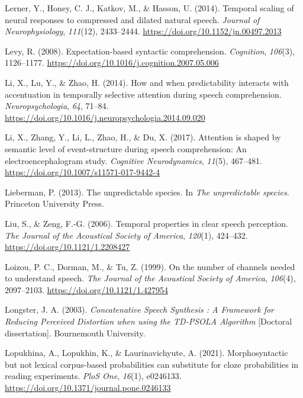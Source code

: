 \documentclass[a4paper, nobind]{templates/ociamthesis}
\newlength{\cslhangindent}
\newenvironment{CSLReferences}[2] %
 {%
  \setlength{\parindent}{0pt}
  \ifodd #1
  \let\oldpar\par
  \def\par{\hangindent=\cslhangindent\oldpar}
  \fi
  \setlength{\parskip}{1mm}
  \setlength{\baselineskip}{6mm}
 }%
 {}
\begin{document}
\begin{CSLReferences}{1}{0}
\leavevmode{}%
Lerner, Y., Honey, C. J., Katkov, M., \& Hasson, U. (2014). {Temporal scaling of neural responses to compressed and dilated natural speech}. \emph{Journal of Neurophysiology}, \emph{111}(12), 2433--2444. \url{https://doi.org/10.1152/jn.00497.2013}

\leavevmode{}%
Levy, R. (2008). Expectation-based syntactic comprehension. \emph{Cognition}, \emph{106}(3), 1126--1177. \url{https://doi.org/10.1016/j.cognition.2007.05.006}

\leavevmode{}%
Li, X., Lu, Y., \& Zhao, H. (2014). {How and when predictability interacts with accentuation in temporally selective attention during speech comprehension}. \emph{Neuropsychologia}, \emph{64}, 71--84. \url{https://doi.org/10.1016/j.neuropsychologia.2014.09.020}

\leavevmode{}%
Li, X., Zhang, Y., Li, L., Zhao, H., \& Du, X. (2017). {Attention is shaped by semantic level of event-structure during speech comprehension: An electroencephalogram study}. \emph{Cognitive Neurodynamics}, \emph{11}(5), 467--481. \url{https://doi.org/10.1007/s11571-017-9442-4}

\leavevmode{}%
Lieberman, P. (2013). The unpredictable species. In \emph{The unpredictable species}. Princeton University Press.

\leavevmode{}%
Liu, S., \& Zeng, F.-G. (2006). {Temporal properties in clear speech perception}. \emph{The Journal of the Acoustical Society of America}, \emph{120}(1), 424--432. \url{https://doi.org/10.1121/1.2208427}

\leavevmode{}%
Loizou, P. C., Dorman, M., \& Tu, Z. (1999). On the number of channels needed to understand speech. \emph{The Journal of the Acoustical Society of America}, \emph{106}(4), 2097--2103. \url{https://doi.org/10.1121/1.427954}

\leavevmode{}%
Longster, J. A. (2003). \emph{{Concatenative Speech Synthesis : A Framework for Reducing Perceived Distortion when using the TD-PSOLA Algorithm}} {[}Doctoral dissertation{]}. Bournemouth University.

\leavevmode{}%
Lopukhina, A., Lopukhin, K., \& Laurinavichyute, A. (2021). Morphosyntactic but not lexical corpus-based probabilities can substitute for cloze probabilities in reading experiments. \emph{PloS One}, \emph{16}(1), e0246133. \url{https://doi.org/10.1371/journal.pone.0246133}


\end{CSLReferences}
\end{document}
